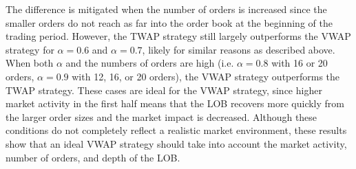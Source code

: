 The difference is mitigated when the number of orders is increased since the smaller orders do not reach as far into the order book at the beginning of the trading period. However, the TWAP strategy still largely outperforms the VWAP strategy for $\alpha = 0.6$ and $\alpha = 0.7$, likely for similar reasons as described above. When both $\alpha$ and the numbers of orders are high (i.e. $\alpha = 0.8$ with 16 or 20 orders, $\alpha = 0.9$ with 12, 16, or 20 orders), the VWAP strategy outperforms the TWAP strategy. These cases are ideal for the VWAP strategy, since higher market activity in the first half means that the LOB recovers more quickly from the larger order sizes and the market impact is decreased. Although these conditions do not completely reflect a realistic market environment, these results show that an ideal VWAP strategy should take into account the market activity, number of orders, and depth of the LOB.

